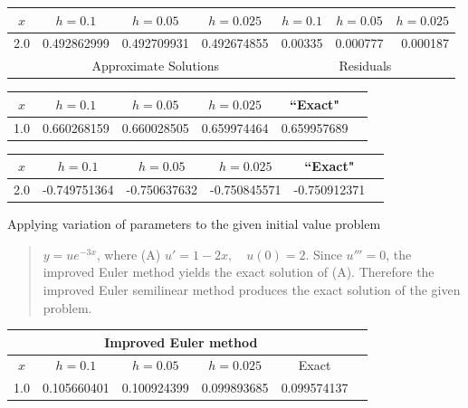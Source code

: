 \bigskip

{\small
\begin{tabular}{|c|r|r|r|r|r|r|}\hline
\multicolumn{1}{|c|}{$x$}&
\multicolumn{1}{|c|}{$h=0.1$}&
\multicolumn{1}{|c|}{$h=0.05$}&
\multicolumn{1}{|c|}{$h=0.025$}&
\multicolumn{1}{|c|}{$h=0.1$}&
\multicolumn{1}{|c|}{$h=0.05$}&
\multicolumn{1}{|c|}{$h=0.025$}\\ \hline
2.0 & 0.492862999 & 0.492709931 & 0.492674855 &0.00335 & 0.000777 &  0.000187  \\
\hline
&\multicolumn{3}{c|}{Approximate Solutions}&
\multicolumn{3}{c|}{Residuals}\\\hline
\end{tabular}}

\bigskip

{\small
\begin{tabular}{|c|r|r|r|r|r|}
\hline
\multicolumn{1}{|c|}{$x$}&
\multicolumn{1}{|c|}{$h=0.1$}&
\multicolumn{1}{|c|}{$h=0.05$}&
\multicolumn{1}{|c|}{$h=0.025$}&
\multicolumn{1}{|c|}{``Exact"}\\ \hline
1.0 & 0.660268159 & 0.660028505 & 0.659974464 & 0.659957689 \\
\hline
\end{tabular}}

\bigskip

{\small
\begin{tabular}{|c|r|r|r|r|r|}
\hline
\multicolumn{1}{|c|}{$x$}&
\multicolumn{1}{|c|}{$h=0.1$}&
\multicolumn{1}{|c|}{$h=0.05$}&
\multicolumn{1}{|c|}{$h=0.025$}&
\multicolumn{1}{|c|}{``Exact"}\\ \hline
2.0 & -0.749751364 & -0.750637632 & -0.750845571 & -0.750912371 \\
\hline
\end{tabular}}

\bigskip

Applying variation of parameters to the given initial value problem

\begin{quote} $y=ue^{-3x}$, where (A) $u'=1-2x,\quad u(0)=2$. Since
$u'''=0$,
the improved Euler method yields the exact solution of (A). Therefore
the improved Euler semilinear method produces the exact solution of
the given problem.\end{quote}

\bigskip
{\small
\begin{tabular}{|c|r|r|r|r|r|}
\hline
\multicolumn{5}{|c|}{Improved Euler method}\\\hline
\multicolumn{1}{|c|}{$x$}&
\multicolumn{1}{|c|}{$h=0.1$}&
\multicolumn{1}{|c|}{$h=0.05$}&
\multicolumn{1}{|c|}{$h=0.025$}&
\multicolumn{1}{|c|}{Exact}\\ \hline
1.0 & 0.105660401 & 0.100924399 & 0.099893685 & 0.099574137 \\
\hline
\end{tabular}}

